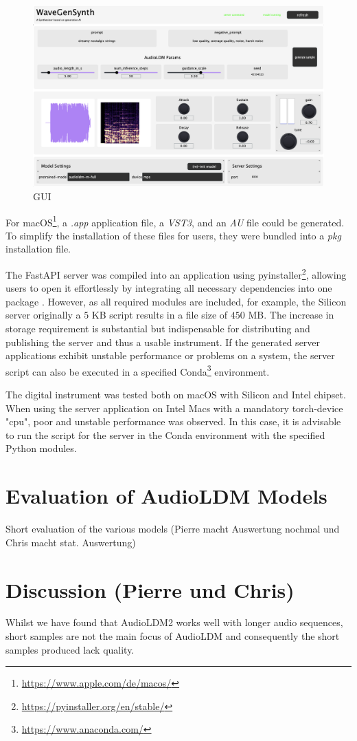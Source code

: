 \documentclass{nime-alternate} %
\begin{document}
\begin{figure}[h]
  \centering
  \includegraphics[width=.5\textwidth]{graphics/synth.png}
  \caption[GUI]{GUI}
  \label{fig:synth}
\end{figure} 

For macOS\footnote{\url{https://www.apple.com/de/macos/}}, a \emph{.app} application file, a \emph{VST3}, and an \emph{AU} file could be generated. To simplify the installation of these files for users, they were bundled into a \emph{pkg} installation file.

The FastAPI server was compiled into an application using pyinstaller\footnote{\url{https://pyinstaller.org/en/stable/}}, allowing users to open it effortlessly by integrating all necessary dependencies into one package \cite{pyinstaller}. However, as all required modules are included, for example, the Silicon server originally a $5$ KB script results in a file size of $450$ MB. The increase in storage requirement is substantial but indispensable for distributing and publishing the server and thus a usable instrument. If the generated server applications exhibit unstable performance or problems on a system, the server script can also be executed in a specified Conda\footnote{\url{https://www.anaconda.com/}} environment.

The digital instrument was tested both on macOS with Silicon and Intel chipset. When using the server application on Intel Macs with a mandatory torch-device "cpu", poor and unstable performance was observed. In this case, it is advisable to run the script for the server in the Conda environment with the specified Python modules.

\section{Evaluation of AudioLDM Models}
Short evaluation of the various models
(Pierre macht Auswertung nochmal und Chris macht stat. Auswertung)

\section{Discussion (Pierre und Chris)}
Whilst we have found that AudioLDM2 works well with longer audio sequences, short samples are not the main focus of AudioLDM and consequently the short samples produced lack quality.
\end{document}
